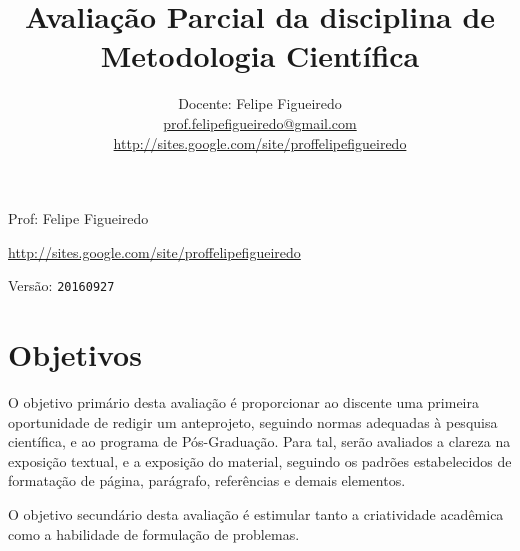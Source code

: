 \documentclass[a4paper]{article}
\title{Avaliação Parcial da disciplina de Metodologia Científica}
\date{}
\author{Docente: Felipe Figueiredo\\
  \url{prof.felipefigueiredo@gmail.com}\\
  \url{http://sites.google.com/site/proffelipefigueiredo}
}
\begin{document}



\parbox[c]{.825\textwidth}{\raggedright%
{Prof: Felipe Figueiredo\par}
{\url{http://sites.google.com/site/proffelipefigueiredo}\par}
}

Versão: \verb|20160927|




\section{Objetivos}
O objetivo primário desta avaliação é proporcionar ao discente uma
primeira oportunidade de redigir um anteprojeto, seguindo normas
adequadas à pesquisa científica, e ao programa de Pós-Graduação. Para
tal, serão avaliados a clareza na exposição textual, e a exposição do
material, seguindo os padrões estabelecidos de formatação de página,
parágrafo, referências e demais elementos.

O objetivo secundário desta avaliação é estimular tanto a criatividade
acadêmica como a habilidade de formulação de problemas.
\end{document}
